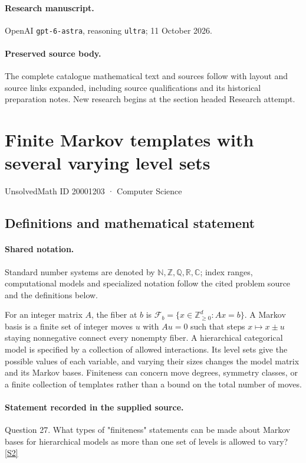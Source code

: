\documentclass[11pt]{article}
\begin{document}
\paragraph{Research manuscript.} OpenAI \texttt{gpt-6-astra}, reasoning \texttt{ultra}; 11 October 2026.
\paragraph{Preserved source body.} The complete catalogue mathematical text and sources follow with layout and source links expanded, including source qualifications and its historical preparation notes. New research begins at the section headed Research attempt.

\section{Finite Markov templates with several varying level sets}\label{20001203}
{\small UnsolvedMath ID 20001203 · Computer Science}
\subsection{Definitions and mathematical statement}

\paragraph{Shared notation.}Standard number systems are denoted by $\mathbb N,\mathbb Z,\mathbb Q,\mathbb R,\mathbb C$; index ranges, computational models and specialized notation follow the cited problem source and the definitions below.


For an integer matrix $A$, the fiber at $b$ is $\mathcal F_b=\{x\in\mathbb Z_{\ge0}^d:Ax=b\}$. A Markov basis is a finite set of integer moves $u$ with $Au=0$ such that steps $x\mapsto x\pm u$ staying nonnegative connect every nonempty fiber. A hierarchical categorical model is specified by a collection of allowed interactions. Its level sets give the possible values of each variable, and varying their sizes changes the model matrix and its Markov bases. Finiteness can concern move degrees, symmetry classes, or a finite collection of templates rather than a bound on the total number of moves.
\paragraph{Statement recorded in the supplied source.}
Question 27. What types of "finiteness" statements can be made about Markov bases for hierarchical models as more than one set of levels is allowed to vary? \href{https://aimath.org/WWN/compalgstat/compalgstat.pdf}{[S2]}
\end{document}
